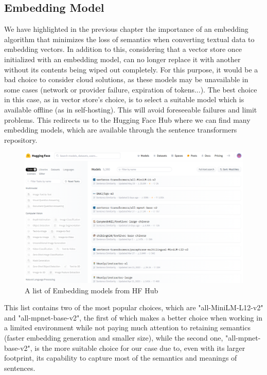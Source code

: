 \subsection{Embedding Model}
We have highlighted in the previous chapter the importance of an embedding algorithm that minimizes the loss of semantics when converting textual data to embedding vectors. In addition to this, considering that a vector store once initialized with an embedding model, can no longer replace it with another without its contents being wiped out completely. For this purpose, it would be a bad choice to consider cloud solutions, as these models may be unavailable in some cases (network or provider failure, expiration of tokens...).\newline
The best choice in this case, as in vector store's choice, is to select a suitable model which is available offline (as in self-hosting). This will avoid foreseeable failures and limit problems.\newline
This redirects us to the Hugging Face Hub where we can find many embedding models, which are available through the sentence transformers repository.
\begin{figure}[H]
    \centering
    \includegraphics[width=.85\linewidth]{./figures/hf-embedding-models.png}
    \caption{A list of Embedding models from HF Hub \cite{hfmodels}}
\end{figure}
This list contains two of the most popular choices, which are "all-MiniLM-L12-v2" and "all-mpnet-base-v2", the first of which makes a better choice when working in a limited environment while not paying much attention to retaining semantics (faster embedding generation and smaller size), while the second one, "all-mpnet-base-v2", is the more suitable choice for our case due to, even with its larger footprint, its capability to capture most of the semantics and meanings of sentences.
